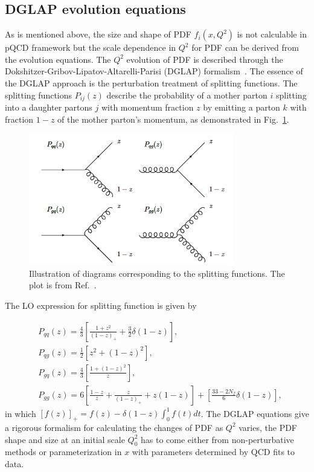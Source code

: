 \subsection{DGLAP evolution equations}
As is mentioned above, the size and shape of PDF $f_{i}(x,Q^{2})$ is not
calculable in pQCD framework but the scale dependence in $Q^{2}$ for PDF can be
derived from the evolution equations. The $Q^{2}$ evolution of PDF is described
through the Dokshitzer-Gribov-Lipatov-Altarelli-Parisi (DGLAP)
formalism~\cite{Dokshitzer:1977sg,Gribov:1972ri,Altarelli:1977zs}. The essence
of the DGLAP approach is the perturbation treatment of splitting functions. The
splitting functions $P_{ij}(z)$ describe the probability of a
mother parton $i$ splitting into a daughter partons $j$ with momentum fraction
$z$ by emitting a parton $k$ with fraction $1-z$ of the mother parton's
momentum, as demonstrated in Fig.~\ref{fig:split_fun}.

\begin{figure}
\centering
\includegraphics[width=0.8\textwidth]{plots/chpt2/split_fun.png}
\caption[Feynman diagrams corresponding to different splitting functions] {
Illustration of diagrams corresponding to the splitting functions. The plot is from Ref.~\cite{Belov:2013oda}. }
\label{fig:split_fun}
\end{figure}

The LO expression for splitting function is given by


\begin{align}
& P_{qq}(z)=\frac{4}{3}[\frac{1+z^{2}}{(1-z)_{+}}+\frac{3}{2}\delta(1-z)], \\
& P_{qg}(z)=\frac{1}{2}[z^{2}+(1-z)^{2}], \\
& P_{gq}(z)=\frac{4}{3}[\frac{1+(1-z)^{2}}{z}], \\
& P_{gg}(z)=6[\frac{1-z}{z}+\frac{z}{(1-z)_{+}}+z(1-z)]+[\frac{33-2N_{f}}{6}\delta(1-z)],
\end{align}
in which $[f(z)]_{+}=f(z)-\delta(1-z)\int^{1}_{0}f(t)dt$.
The DGLAP equations give a rigorous formalism for calculating the changes of PDF
as $Q^{2}$ varies, the PDF shape and size at an initial scale $Q^{2}_{0}$ has to
come either from non-perturbative methods or parameterization in $x$ with
parameters determined by QCD fits to data.

